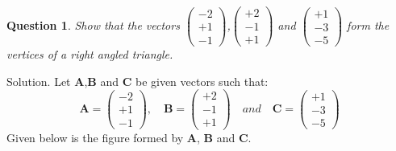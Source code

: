 \documentclass{article}
\newtheorem{question}[theorem]{Question}
\newcommand{\myvec}[1]{\ensuremath{\begin{pmatrix}#1\end{pmatrix}}}
\let\vec\mathbf
\begin{document}
\begin{question}
Show that the vectors $\myvec{-2 \\ +1 \\ -1}$,$\myvec{+2 \\ -1 \\ +1}$ and $\myvec{+1\\-3\\-5}$
form the vertices of a right angled triangle.
\end{question}
Solution. Let $\vec{A}$,$\vec{B}$  and $\vec{C}$ be given vectors such that:
\begin{equation}
\vec{A} = \myvec{-2 \\ +1 \\ -1}, \quad \vec{B}=\myvec{+2 \\ -1 \\ +1} \quad and \quad
\vec{C}= \myvec{+1\\-3\\-5}	
\end{equation}
Given below is the figure formed by $\vec{A}$, $\vec{B}$ and $\vec{C}$.
\end{document}
